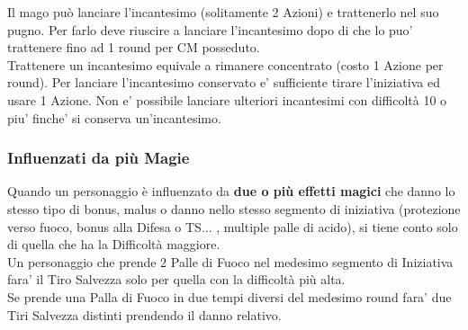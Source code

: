 \begin{multicols}{2}
Il mago può lanciare l'incantesimo (solitamente 2 Azioni) e trattenerlo nel suo pugno. Per farlo deve riuscire a lanciare l'incantesimo dopo di che lo puo' trattenere fino ad 1 round per CM posseduto.\\
Trattenere un incantesimo equivale a rimanere concentrato (costo 1 Azione per round).
Per lanciare l'incantesimo conservato e' sufficiente tirare l'iniziativa ed usare 1 Azione. Non e' possibile lanciare ulteriori incantesimi con difficoltà 10 o piu' finche' si conserva un'incantesimo.

\subsubsection{Influenzati da più Magie}

Quando un personaggio è influenzato da \textbf{due o più effetti magici} che danno lo stesso tipo di bonus, malus o danno nello stesso segmento di iniziativa (protezione verso fuoco, bonus alla Difesa o TS... , multiple palle di acido), si tiene conto solo di quella che ha la Difficoltà maggiore.\\
Un personaggio che prende 2 Palle di Fuoco nel medesimo segmento di Iniziativa fara' il Tiro Salvezza solo per quella con la difficoltà più alta.\\
Se prende una Palla di Fuoco in due tempi diversi del medesimo round fara' due Tiri Salvezza distinti prendendo il danno relativo.



\end{multicols}
